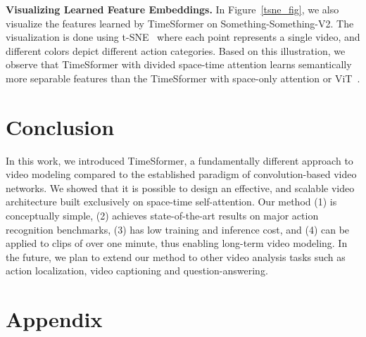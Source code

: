 \documentclass{article}
\begin{document}
\textbf{Visualizing Learned Feature Embeddings.} In Figure~\ref{tsne_fig}, we also visualize the features learned by TimeSformer on Something-Something-V2. The visualization is done using t-SNE~\cite{vanDerMaaten2008} where each point represents a single video, and different colors depict different action categories. Based on this illustration, we observe that TimeSformer with divided space-time attention learns semantically more separable features than the TimeSformer with space-only attention or ViT~\cite{Dosovitskiy:ICLR2021}.


\section{Conclusion}

In this work, we introduced TimeSformer, a fundamentally different approach to video modeling compared to the established paradigm of convolution-based video networks. We showed that it is possible to design an effective, and scalable video architecture built exclusively on space-time self-attention.  Our method (1) is conceptually simple, (2) achieves state-of-the-art results on major action recognition benchmarks, (3) has low training and inference cost, and (4) can be applied to clips of over one minute, thus enabling long-term video modeling. In the future, we plan to extend our method to other video analysis tasks such as action localization, video captioning and question-answering.


 


\appendix
\section*{Appendix}
\end{document}
